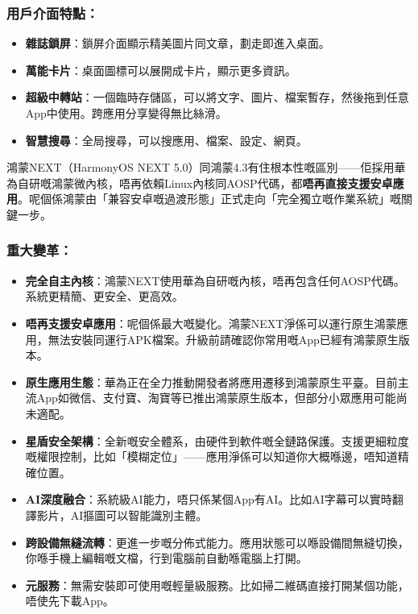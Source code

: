 \subsubsection*{用戶介面特點：}

\begin{itemize}
  \item \textbf{雜誌鎖屏}：鎖屏介面顯示精美圖片同文章，劃走即進入桌面。
  \item \textbf{萬能卡片}：桌面圖標可以展開成卡片，顯示更多資訊。
  \item \textbf{超級中轉站}：一個臨時存儲區，可以將文字、圖片、檔案暫存，然後拖到任意App中使用。跨應用分享變得無比絲滑。
  \item \textbf{智慧搜尋}：全局搜尋，可以搜應用、檔案、設定、網頁。
\end{itemize}


鴻蒙NEXT（HarmonyOS NEXT 5.0）同鴻蒙4.3有住根本性嘅區別——佢採用華為自研嘅鴻蒙微內核，唔再依賴Linux內核同AOSP代碼，都\textbf{唔再直接支援安卓應用}。呢個係鴻蒙由「兼容安卓嘅過渡形態」正式走向「完全獨立嘅作業系統」嘅關鍵一步。

\subsubsection*{重大變革：}

\begin{itemize}
  \item \textbf{完全自主內核}：鴻蒙NEXT使用華為自研嘅內核，唔再包含任何AOSP代碼。系統更精簡、更安全、更高效。
  \item \textbf{唔再支援安卓應用}：呢個係最大嘅變化。鴻蒙NEXT淨係可以運行原生鴻蒙應用，無法安裝同運行APK檔案。升級前請確認你常用嘅App已經有鴻蒙原生版本。
  \item \textbf{原生應用生態}：華為正在全力推動開發者將應用遷移到鴻蒙原生平臺。目前主流App如微信、支付寶、淘寶等已推出鴻蒙原生版本，但部分小眾應用可能尚未適配。
  \item \textbf{星盾安全架構}：全新嘅安全體系，由硬件到軟件嘅全鏈路保護。支援更細粒度嘅權限控制，比如「模糊定位」——應用淨係可以知道你大概喺邊，唔知道精確位置。
  \item \textbf{AI深度融合}：系統級AI能力，唔只係某個App有AI。比如AI字幕可以實時翻譯影片，AI摳圖可以智能識別主體。
  \item \textbf{跨設備無縫流轉}：更進一步嘅分佈式能力。應用狀態可以喺設備間無縫切換，你喺手機上編輯嘅文檔，行到電腦前自動喺電腦上打開。
  \item \textbf{元服務}：無需安裝即可使用嘅輕量級服務。比如掃二維碼直接打開某個功能，唔使先下載App。
\end{itemize}

